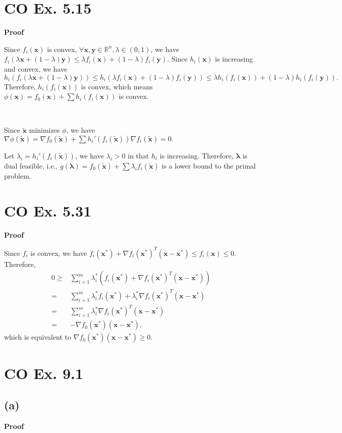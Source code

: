 \documentclass[12pt]{article}
\begin{document}
\section*{CO Ex. 5.15}
\textbf{Proof}

Since $f_i(\bm{x})$ is convex, $\forall \bm{x},\bm{y}\in\mathbb{R}^n,\lambda\in (0,1)$, we have $f_i(\lambda\bm{x}+(1-\lambda)\bm{y})\le\lambda f_i(\bm{x})+(1-\lambda)f_i(\bm{y})$. Since $h_i(\bm{x})$ is increasing and convex, we have $$h_i(f_i(\lambda\bm{x}+(1-\lambda)\bm{y}))\le h_i(\lambda f_i(\bm{x})+(1-\lambda)f_i(\bm{y}))\le \lambda h_i(f_i(\bm{x}))+(1-\lambda)h_i(f_i(\bm{y})).$$ Therefore, $h_i(f_i(\bm{x}))$ is convex, which means $\phi(\bm{x})=f_0(\bm{x})+\sum h_i(f_i(\bm{x}))$ is convex.

~

Since $\tilde{\bm{x}}$ minimizes $\phi$, we have $\nabla \phi(\tilde{\bm{x}})=\nabla f_0(\tilde{\bm{x}})+\sum h_i'(f_i(\tilde{\bm{x}}))\nabla f_i(\tilde{\bm{x}})=0.$

Let $\lambda_i=h_i'(f_i(\tilde{\bm{x}}))$, we have $\lambda_i>0$ in that $h_i$ is increasing. Therefore, $\bm{\lambda}$ is dual feasible, i.e., $g(\bm{\lambda})=f_0(\tilde{\bm{x}})+\sum\lambda_i f_i(\tilde{\bm{x}})$ is a lower bound to the primal problem.

\section*{CO Ex. 5.31}
\textbf{Proof}

Since $f_i$ is convex, we have $f_i(\bm{x}^*)+\nabla f_i(\bm{x}^*)^T(\bm{x}-\bm{x}^*)\le f_i(\bm{x})\le 0$. Therefore,
\begin{align*}
0\ge&\sum_{i=1}^m\lambda_i^*(f_i(\bm{x}^*)+\nabla f_i(\bm{x}^*)^T(\bm{x}-\bm{x}^*))\\
=&\sum_{i=1}^m\lambda_i^*f_i(\bm{x}^*)+\lambda_i^*\nabla f_i(\bm{x}^*)^T(\bm{x}-\bm{x}^*)\\
=&\sum_{i=1}^m\lambda_i^*\nabla f_i(\bm{x}^*)^T(\bm{x}-\bm{x}^*)\\
=&-\nabla f_0(\bm{x}^*)(\bm{x}-\bm{x}^*),
\end{align*}
which is equivalent to $\nabla f_0(\bm{x}^*)(\bm{x}-\bm{x}^*)\ge 0.$

\section*{CO Ex. 9.1}
\subsection*{(a)}
\textbf{Proof}
\end{document}
